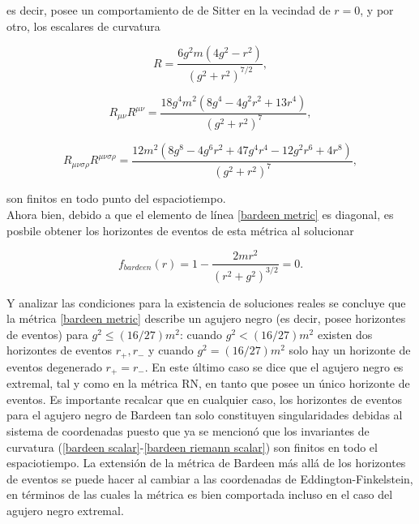 \documentclass{article}
\numberwithin{equation}{section}
\theoremstyle{definition}
\begin{document}
es decir, posee un comportamiento de de Sitter en la vecindad de $r = 0$, y por otro, los escalares de curvatura

\begin{equation}
\label{bardeen scalar}
R = \frac{6 g^2 m \left(4 g^2-r^2\right)}{\left(g^2+r^2\right)^{7/2}},
\end{equation}

\begin{equation}
\label{bardeen ricci scalar}
R_{\mu \nu}R^{\mu \nu} = \frac{18 g^4 m^2 \left(8 g^4-4 g^2 r^2+13 r^4\right)}{\left(g^2+r^2\right)^7},
\end{equation}

\begin{equation}
\label{bardeen riemann scalar}
R_{\mu \nu \sigma \rho}R^{\mu \nu \sigma \rho} = \frac{12 m^2 \left(8 g^8-4 g^6 r^2+47 g^4 r^4-12 g^2 r^6+4 r^8\right)}{\left(g^2+r^2\right)^7},
\end{equation}

son finitos en todo punto  del espaciotiempo.\\

Ahora bien, debido a que el elemento de línea \eqref{bardeen metric} es diagonal, es posbile obtener los horizontes de eventos de esta métrica al solucionar

\begin{equation}
f_{bardeen}(r) = 1 - \frac{2mr^2}{(r^2 + g^2)^{3/2}} = 0.
\end{equation}

Y analizar las condiciones para la existencia de soluciones reales se concluye que la métrica \eqref{bardeen metric} describe un agujero negro (es decir, posee horizontes de eventos) para $g^2 \leq (16/27)m^2$: cuando $g^2 < (16/27)m^2$ existen dos horizontes de eventos $r_{+},r_{-}$ y cuando $g^2 = (16/27)m^2$ solo hay un horizonte de eventos degenerado $r_{+} = r_{-}$. En este último caso se dice que el agujero negro es extremal, tal y como en la métrica RN, en tanto que posee un único horizonte de eventos. Es importante recalcar que en cualquier caso, los horizontes de eventos para el agujero negro de Bardeen tan solo constituyen singularidades debidas al sistema de coordenadas puesto que ya se mencionó que los invariantes de curvatura (\ref{bardeen scalar}-\ref{bardeen riemann scalar}) son finitos en todo el espaciotiempo. La extensión de la métrica de Bardeen más allá de los horizontes de eventos se puede hacer al cambiar a las coordenadas de Eddington-Finkelstein, en términos de las cuales la métrica es bien comportada incluso en el caso del agujero negro extremal. \\
\end{document}
